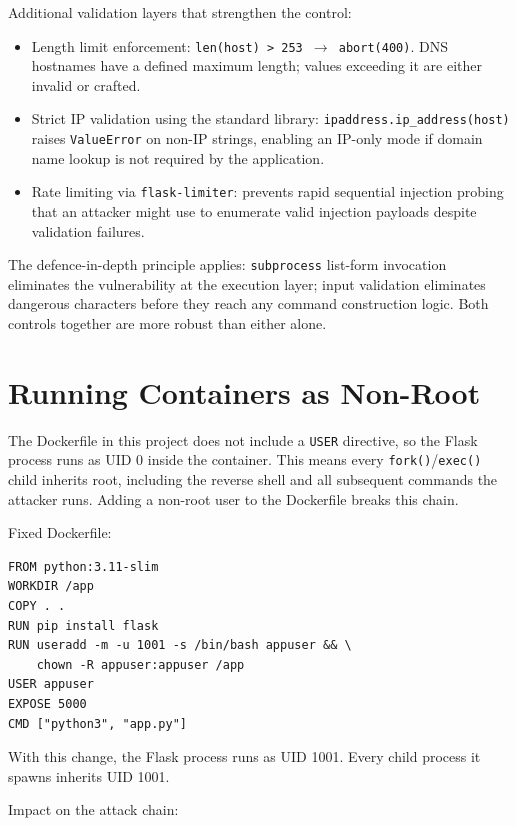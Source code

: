 Additional validation layers that strengthen the control:

\begin{itemize}
    \item Length limit enforcement: \texttt{len(host) > 253 $\rightarrow$ abort(400)}. DNS hostnames have a defined maximum length; values exceeding it are either invalid or crafted.
    \item Strict IP validation using the standard library: \texttt{ipaddress.ip\_address(host)} raises \texttt{ValueError} on non-IP strings, enabling an IP-only mode if domain name lookup is not required by the application.
    \item Rate limiting via \texttt{flask-limiter}: prevents rapid sequential injection probing that an attacker might use to enumerate valid injection payloads despite validation failures.
\end{itemize}

The defence-in-depth principle applies: \texttt{subprocess} list-form invocation eliminates the vulnerability at the execution layer; input validation eliminates dangerous characters before they reach any command construction logic. Both controls together are more robust than either alone.


\section{Running Containers as Non-Root}

The Dockerfile in this project does not include a \texttt{USER} directive, so the Flask process runs as UID 0 inside the container. This means every \texttt{fork()}/\texttt{exec()} child inherits root, including the reverse shell and all subsequent commands the attacker runs. Adding a non-root user to the Dockerfile breaks this chain.

Fixed Dockerfile:

\begin{lstlisting}
FROM python:3.11-slim
WORKDIR /app
COPY . .
RUN pip install flask
RUN useradd -m -u 1001 -s /bin/bash appuser && \
    chown -R appuser:appuser /app
USER appuser
EXPOSE 5000
CMD ["python3", "app.py"]
\end{lstlisting}

With this change, the Flask process runs as UID 1001. Every child process it spawns inherits UID 1001.

Impact on the attack chain:

